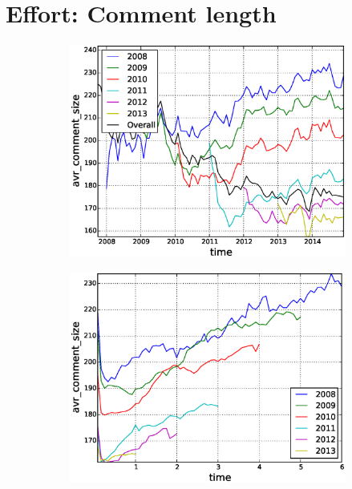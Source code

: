 \section{Effort: Comment length}

\begin{figure}[!tb]
\centering
\begin{subfigure}{.49\textwidth}\includegraphics[scale=0.4]{./images/avr_comment_size_over_time_cohorts.eps}\caption{}\end{subfigure}
\begin{subfigure}{.49\textwidth}\includegraphics[scale=0.4]{./images/avr_comment_size_cohorts.eps}\caption{}\end{subfigure}

\end{figure}
